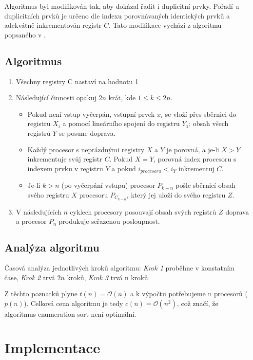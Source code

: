 \documentclass[11pt,a4paper]{article}
\begin{document}
Algoritmus byl modifikován tak, aby dokázal řadit i duplicitní prvky. Pořadí u duplicitních prvků je určeno dle indexu porovnávaných identických prvků a adekvátně inkrementován registr $C$. Tato modifikace vychází z algoritmu popsaného v \cite{bib:sushi}.

\subsection{Algoritmus}
\begin{enumerate}
    \item {Všechny registry C nastaví na hodnotu 1}
    \item {Následující činnosti opakuj $2n$ krát, kde $1 \leq k \leq 2n$.}
        \begin{itemize}
            \item{Pokud není vstup vyčerpán, vstupní prvek $x_i$ se vloží přes sběrnici do registru $X_i$ a pomocí lineárního spojení do registru $Y_1$; obsah všech registrů $Y$ se posune doprava.}
			\item{Každý procesor s neprázdnými registry $X$ a $Y$ je porovná, a je-li $X > Y$ inkrementuje svůj registr $C$. Pokud $X = Y$, porovná index procesoru s indexem prvku v registru $Y$ a pokud $i_{procesoru} < i_{Y}$ inkrementuj $C$.}
			\item{Je-li $k > n$ (po vyčerpání vstupu) procesor $P_{k-n}$ pošle sběrnicí obsah svého registru $X$ procesoru $P_{C_{k-n}}$, který jej uloží do svého registru $Z$.}
        \end{itemize}
	\item{V následujících $n$ cyklech procesory posouvají obsah svých registrů $Z$ doprava a procesor $P_n$ produkuje seřazenou posloupnost.}
\end{enumerate}

\subsection{Analýza algoritmu}
Časová analýza jednotlivých kroků algoritmu: \textit{Krok 1} proběhne v konstatním čase, \textit{Krok 2} trvá $2n$ kroků, \textit{Krok 3} trvá n kroků.

Z těchto poznatků plyne $t(n) = \mathcal{O}(n)$ a k výpočtu potřebujeme n procesorů ($p(n)$). Celková cena algoritmu je tedy $c(n) = \mathcal{O}(n^2)$, což značí, že algoritmus enumeration sort není optimální.

\section{Implementace}
\end{document}
